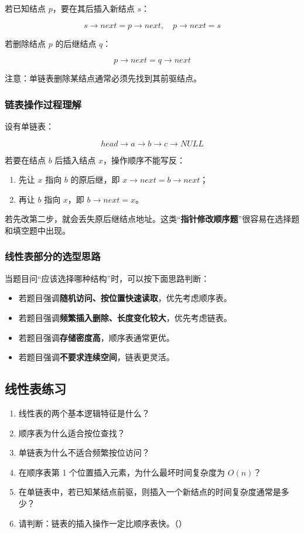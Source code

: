 \documentclass{../../note}
\begin{document}
若已知结点 $p$，要在其后插入新结点 $s$：

\[
s \rightarrow next = p \rightarrow next, \quad p \rightarrow next = s
\]

若删除结点 $p$ 的后继结点 $q$：

\[
p \rightarrow next = q \rightarrow next
\]

注意：单链表删除某结点通常必须先找到其前驱结点。

\subsubsection{链表操作过程理解}

设有单链表：

\[
head \rightarrow a \rightarrow b \rightarrow c \rightarrow NULL
\]

若要在结点 $b$ 后插入结点 $x$，操作顺序不能写反：

\begin{enumerate}
  \item 先让 $x$ 指向 $b$ 的原后继，即 $x \rightarrow next = b \rightarrow next$；
  \item 再让 $b$ 指向 $x$，即 $b \rightarrow next = x$。
\end{enumerate}

若先改第二步，就会丢失原后继结点地址。这类“\textbf{指针修改顺序题}”很容易在选择题和填空题中出现。

\subsubsection{线性表部分的选型思路}

当题目问“应该选择哪种结构”时，可以按下面思路判断：

\begin{itemize}
  \item 若题目强调\textbf{随机访问、按位置快速读取}，优先考虑顺序表。
  \item 若题目强调\textbf{频繁插入删除、长度变化较大}，优先考虑链表。
  \item 若题目强调\textbf{存储密度高}，顺序表通常更优。
  \item 若题目强调\textbf{不要求连续空间}，链表更灵活。
\end{itemize}

\subsection{线性表练习}

\begin{enumerate}
  \item 线性表的两个基本逻辑特征是什么？
  \item 顺序表为什么适合按位查找？
  \item 单链表为什么不适合频繁按位访问？
  \item 在顺序表第 1 个位置插入元素，为什么最坏时间复杂度为 $O(n)$？
  \item 在单链表中，若已知某结点前驱，则插入一个新结点的时间复杂度通常是多少？
  \item 请判断：链表的插入操作一定比顺序表快。（\hspace{1cm}）
\end{enumerate}
\end{document}

